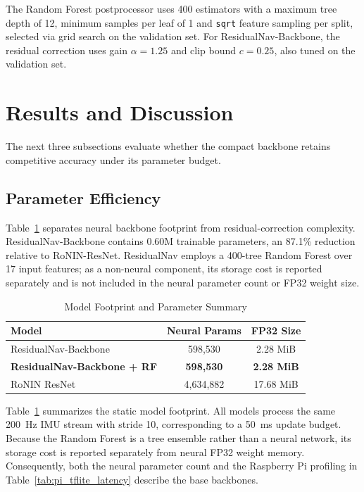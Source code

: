 \documentclass[10pt,conference,letterpaper]{IEEEtran}
\begin{document}
The Random Forest postprocessor uses 400 estimators with a maximum
tree depth of 12, minimum samples per leaf of 1 and \texttt{sqrt}
feature sampling per split, selected via grid search on the
validation set. For ResidualNav-Backbone, the residual correction uses
gain $\alpha = 1.25$ and clip bound $c = 0.25$, also tuned on the
validation set.
\section{Results and Discussion}
\label{sec:results}

The next three subsections evaluate whether the compact backbone retains competitive accuracy under its parameter budget.

\subsection{Parameter Efficiency}

Table~\ref{tab:model_footprint} separates neural backbone footprint from residual-correction complexity. ResidualNav-Backbone contains 0.60M trainable parameters, an 87.1\% reduction relative to RoNIN-ResNet. ResidualNav employs a 400-tree Random Forest over 17 input features; as a non-neural component, its storage cost is reported separately and is not included in the neural parameter count or FP32 weight size.

\begin{table}[htbp]
\caption{Model Footprint and Parameter Summary}
\label{tab:model_footprint}
\centering
\scriptsize
\begin{tabular}{|l|c|c|}
\hline
\textbf{Model} & \textbf{Neural Params} & \textbf{FP32 Size} \\
\hline
ResidualNav-Backbone & 598,530 & 2.28 MiB \\
\textbf{ResidualNav-Backbone + RF} & \textbf{598,530} &
\textbf{2.28 MiB} \\
RoNIN ResNet & 4,634,882 & 17.68 MiB \\
\hline
\end{tabular}
\end{table}

Table~\ref{tab:model_footprint} summarizes the static model footprint. All models process the same 200~Hz IMU stream with stride 10, corresponding to a 50~ms update budget. Because the Random Forest is a tree ensemble rather than a neural network, its storage cost is reported separately from neural FP32 weight memory. Consequently, both the neural parameter count and the Raspberry Pi profiling in Table~\ref{tab:pi_tflite_latency} describe the base backbones.
\end{document}
